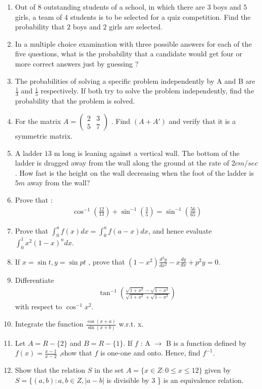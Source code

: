\documentclass[10pt,-letter paper]{article}
\providecommand{\brak}[1]{\ensuremath{\left(#1\right)}}
\newcommand{\myvec}[1]{\ensuremath{\begin{pmatrix}#1\end{pmatrix}}}
\begin{document}
\begin{enumerate}
\item Out of $8$ outstanding students of a school, in which there are $3$ boys and $5$ girls, a team of $4$ students is to be selected for a quiz competition. Find the probability that $2$ boys and $2$ girls are selected.
\item In a multiple choice examination with three possible answers for each of the five questions, what is the probability that a candidate would get four or more correct answers just by guessing ?
\item The probabilities of solving a specific problem independently by A and B are $\frac{1}{3}$ and $\frac{1}{5}$ respectively. If both try to solve the problem independently, find the probability that the problem is solved.
\item For the matrix $A = \myvec{2 & 3  \\ 5 & 7} $ . Find $\brak{A + A'}$ and verify that it is a symmetric matrix.
\item A ladder $13$ m long is leaning against a vertical wall. The bottom of the ladder is dragged away from the wall along the ground at the rate of $2 cm/sec$. How fast is the height on the wall decreasing when the foot of the ladder is $5 m$ away from the wall?
\item Prove that :
	\begin{align*}
		\cos^{-1}\brak{\frac{12}{13}}+\sin^{-1}\brak{\frac{3}{5}}=\sin^{-1} \brak{\frac{56}{65}}
	\end{align*}
\item Prove that $\int_{0}^{a} f \brak {x}d x = \int_{0}^{a} f\brak{a-x} d x$, and hence evaluate  $\int_{0}^{1} x^{2}\brak{1-x}^{n}dx$.
\item If $x = \sin t ,  y= \sin pt$ , prove that $\brak{1-x^{2}}\frac{d^{2}y}{d x^{2}} - x \frac{dy}{dx} + p^{2}y=0$.
\item Differentiate
	\begin{align*}
		\tan^{-1}\brak{\frac{\sqrt{1+x^{2}}-\sqrt{1-x^{2}}}{\sqrt{1+x^{2}}+\sqrt{1-x^{2}}}}
	\end{align*} with respect to $\cos^{-1}x^{2}$.
\item Integrate the function $\frac{\cos\brak{x + a}}{\sin\brak{x + b}}$ w.r.t. x.
\item Let $A = R - \{2\}$ and $B = R - \{1\}$. If $f$ : A $\rightarrow$ B is a function defined by $f\brak{x} = \frac{x - 1}{x - 2 }$ ,show that $f$ is one-one and onto. Hence, find $f^{-1}$.
\item Show that the relation $S$ in the set $A = \{x \in Z : 0  \le x  \le 12\}$ given by $S= \{\brak{a, b} : a, b \in Z, \vert{a-b}\vert $ is divisible by $ 3 $ \} is an equivalence relation.

\end{enumerate}
\end{document}
